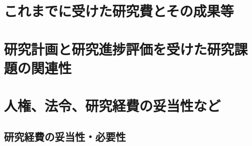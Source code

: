 \documentclass[11pt,a4paper,twoside]{jarticle}
\newcommand{\研究種別}{A}	%
\newcommand{\研究課題名}{コ・クリエイティブなソフトウェア開発のPBL型教育}
\newcommand{\研究機関名}{産業技術大学院大学}
\newcommand{\研究代表者氏名}{中鉢　欣秀}
\newcommand{\研究代表者氏名ふりがな}{ちゅうばち　よしひで}
\newcommand{\本応募effort}{\KLEffort{18}}	%
\newcommand{\研究期間の最終元号年度}{27}	%
\begin{document}
\section{これまでに受けた研究費とその成果等}
\newcommand{\これまでに受けた研究費とその成果等}{%
	\begin{itemize}
		\item 若手研究(B) ，2008～2009年度，
		    「情報システムアーキテクト育成のための遠隔教育システム」，研究代表者，3,900千円\\
		    本研究では社会人教育における利用を想定したモデリング遠隔教育支援シス
            テムを研究開発した．これを用いて，特にユーザ企業の社会人を対象としたモデリング
            教育支援環境を構築し，その有用性を確かめることができた．
    \end{itemize}
}

\section{研究計画と研究進捗評価を受けた研究課題の関連性}
\newcommand{\研究計画と研究進捗評価を受けた研究課題の関連性}{%
	特になし．
}

\section{人権、法令、研究経費の妥当性など}
\newcommand{\人権の保護及び法令等の遵守への対応}{%
	特になし．
}

\subsection{研究経費の妥当性・必要性}
\newcommand{\研究経費の妥当性と必要性}{%
	「研究計画・方法」欄で述べた研究規模、研究体制等を踏まえると、
	次頁以降に記入する研究費は妥当、かつ必要であり、
	積算根拠も妥当である。
}
\end{document}
